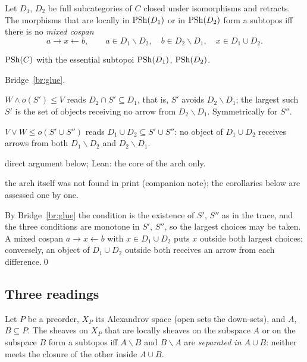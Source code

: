 \begin{theorem}\label{th:cospan}
Let $D_1$, $D_2$ be full subcategories of $C$ closed under isomorphisms and retracts. The morphisms that are locally in $\mathrm{PSh}(D_1)$ or in $\mathrm{PSh}(D_2)$ form a subtopos iff there is no \emph{mixed cospan}
\[
a\longrightarrow x\longleftarrow b,\qquad a\in D_1\smallsetminus D_2,\quad b\in D_2\smallsetminus D_1,\quad x\in D_1\cup D_2.
\]
\end{theorem}

\begin{trace}
\item[deck] $\mathrm{PSh}(C)$ with the essential subtopoi $\mathrm{PSh}(D_1)$, $\mathrm{PSh}(D_2)$.
\item[arch] Bridge~\ref{br:glue}.
\item[specialise] $W\wedge o(S')\le V$ reads $D_2\cap S'\subseteq D_1$, that is, $S'$ avoids $D_2\smallsetminus D_1$; the largest such $S'$ is the set of objects receiving no arrow from $D_2\smallsetminus D_1$. Symmetrically for $S''$.
\item[rewrite] $V\vee W\le o(S'\cup S'')$ reads $D_1\cup D_2\subseteq S'\cup S''$: no object of $D_1\cup D_2$ receives arrows from both $D_1\smallsetminus D_2$ and $D_2\smallsetminus D_1$.
\item[verify] direct argument below; Lean: the core of the arch only.
\item[novelty] the arch itself was not found in print (companion note); the corollaries below are assessed one by one.
\end{trace}

\direct{} By Bridge~\ref{br:glue} the condition is the existence of $S'$, $S''$ as in the trace, and the three conditions are monotone in $S'$, $S''$, so the largest choices may be taken. A mixed cospan $a\to x\leftarrow b$ with $x\in D_1\cup D_2$ puts $x$ outside both largest choices; conversely, an object of $D_1\cup D_2$ outside both receives an arrow from each difference.\qed

\subsection{Three readings}

\begin{corollary}\label{co:alex}
Let $P$ be a preorder, $X_P$ its Alexandrov space (open sets the down-sets), and $A$, $B\subseteq P$. The sheaves on $X_P$ that are locally sheaves on the subspace $A$ or on the subspace $B$ form a subtopos iff $A\smallsetminus B$ and $B\smallsetminus A$ are \emph{separated in $A\cup B$}: neither meets the closure of the other inside $A\cup B$.
\end{corollary}

